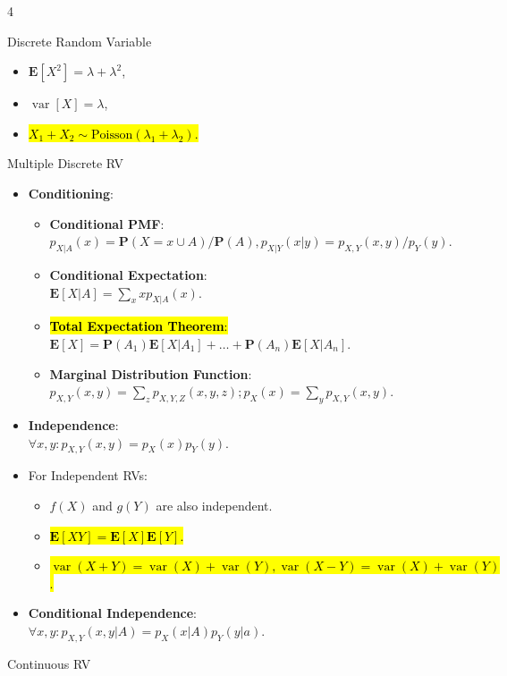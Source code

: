 \documentclass[landscape,a4paper]{article}
\renewcommand{\emph}[1]{\hl{#1}}
\newcommand{\PP}{\mathbf{P}}
\newcommand{\EE}{\mathbf{E}}
\newcommand{\var}{\operatorname{var}}
\begin{document}
\begin{multicols*}{4}
\begin{card}{Discrete Random Variable}
\begin{itemize}
\begin{itemize}
\begin{itemize}
						\item $\EE[X^2]=\lambda+\lambda^2$,
						\item $\var[X]=\lambda$,
						\item \emph{$X_1+X_2\sim\text{Poisson}(\lambda_1+\lambda_2)$.}
					\end{itemize}
				\end{itemize}
				\end{itemize}
			\end{card}
			\begin{card}{Multiple Discrete RV}
				\begin{itemize}
					\item \textbf{Conditioning}:
					\begin{itemize}
						\item \textbf{Conditional PMF}:\\ $p_{X|A}(x)=\PP(X=x\cup A)/\PP(A),p_{X|Y}(x|y)=p_{X,Y}(x,y)/p_Y(y)$.
						\item \textbf{Conditional Expectation}:\\ $\EE[X|A]=\sum_x xp_{X|A}(x)$.
						\item \emph{\textbf{Total Expectation Theorem}:}\\ $\EE[X]=\PP(A_1)\EE[X|A_1]+\dots +\PP(A_n)\EE[X|A_n]$.
						\item \textbf{Marginal Distribution Function}:\\ $p_{X,Y}(x,y)=\sum_z p_{X,Y,Z}(x,y,z);p_X(x)=\sum_y p_{X,Y}(x,y)$.
					\end{itemize}
					\item \textbf{Independence}:\\ $\forall x,y\colon p_{X,Y}(x,y)=p_X(x)p_Y(y)$.
					\item For Independent RVs:
					\begin{itemize}
						\item $f(X)$ and $g(Y)$ are also independent.
						\item \emph{$\EE[XY]=\EE[X]\EE[Y]$.}
						\item \emph{$\var(X+Y)=\var(X)+\var(Y), \var(X-Y)=\var(X)+\var(Y)$.}
					\end{itemize}
					\item \textbf{Conditional Independence}:\\ $\forall x,y\colon p_{X,Y}(x,y|A)=p_X(x|A)p_Y(y|a)$.
				\end{itemize}
		\end{card}
		\begin{card}{Continuous RV}
			\begin{itemize}

\end{itemize}
\end{card}
\end{multicols*}
\end{document}
